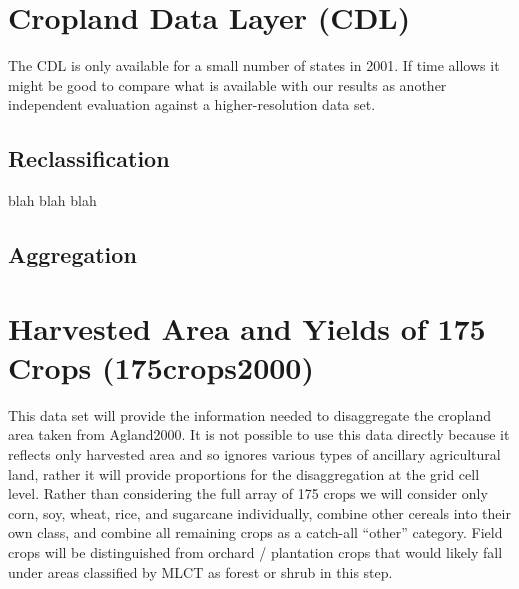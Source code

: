 \section{Cropland Data Layer (CDL)}
\label{sec:cdl}


The CDL is only available for a small number of states in 2001.  If
time allows it might be good to compare what is available with our
results as another independent evaluation against a higher-resolution
data set.

\subsection{Reclassification}
\label{sec:cdl-reclass}

blah blah blah






\subsection{Aggregation}
\label{sec:cdl-aggr}


\section{Harvested Area and Yields of 175 Crops (175crops2000)}
\label{sec:175crops2000}

\citet{Monfreda2008}




This data set will provide the information needed to disaggregate the
cropland area taken from Agland2000.  It is not possible to use this
data directly because it reflects only harvested area and so ignores
various types of ancillary agricultural land, rather it will provide
proportions for the disaggregation at the grid cell level.  Rather
than considering the full array of 175 crops we will consider only
corn, soy, wheat, rice, and sugarcane individually, combine other
cereals into their own class, and combine all remaining crops as a
catch-all ``other'' category.  Field crops will be distinguished from
orchard / plantation crops that would likely fall under areas
classified by MLCT as forest or shrub in this step.


